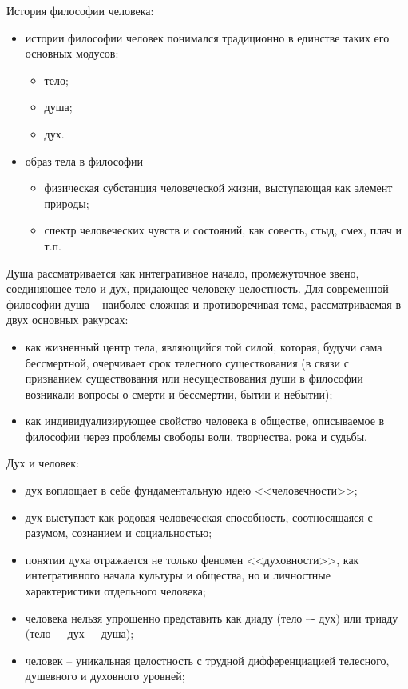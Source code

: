 История философии человека:
\begin{itemize}
    \item истории философии человек понимался традиционно в единстве таких его основных модусов:
    \begin{itemize}
        \item тело;
        \item душа;
        \item дух.
    \end{itemize}
    \item образ тела в философии
    \begin{itemize}
        \item физическая субстанция человеческой жизни, выступающая как элемент природы;
        \item спектр человеческих чувств и состояний, как совесть, стыд, смех, плач и т.п. 
    \end{itemize}
\end{itemize}

Душа рассматривается как интегративное начало, промежуточное звено, соединяющее тело и дух, придающее 
человеку целостность. Для современной философии душа -- наиболее сложная и противоречивая тема, 
рассматриваемая в двух основных ракурсах:
\begin{itemize}
    \item как жизненный центр тела, являющийся той силой, которая, будучи сама бессмертной,  очерчивает срок 
        телесного существования (в связи с признанием существования или несуществования души 
        в философии возникали вопросы о смерти и бессмертии, бытии и небытии);
    \item как индивидуализирующее свойство человека в обществе, описываемое в философии через 
        проблемы свободы воли, творчества, рока и судьбы.
\end{itemize}

Дух и человек:
\begin{itemize}
    \item дух воплощает в себе фундаментальную идею <<человечности>>;
    \item дух выступает как родовая человеческая способность, соотносящаяся с разумом, сознанием и 
        социальностью;
    \item понятии духа отражается не только феномен <<духовности>>, как интегративного начала культуры и 
        общества, но и личностные характеристики отдельного человека;
    \item человека нельзя упрощенно представить как диаду (тело –- дух) или триаду (тело –- дух –- душа);
    \item человек -- уникальная целостность с трудной дифференциацией телесного, душевного и духовного 
        уровней; 
\end{itemize}